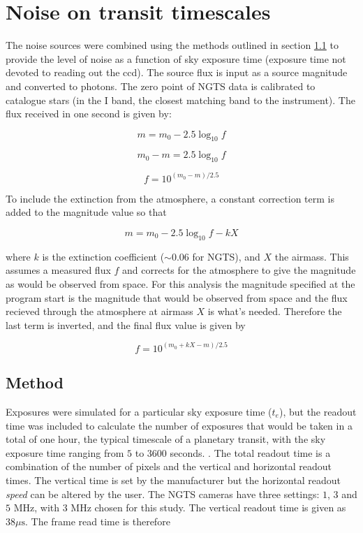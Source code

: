 \documentclass[11pt,a4paper]{report}
\begin{document}
\section{Noise on transit timescales}

The noise sources were combined using the methods outlined in section
\ref{sec:method} to provide the level of noise as a function of sky
exposure time (exposure time not devoted to reading out the ccd). The
source flux is input as a source magnitude and converted to photons. The
zero point of NGTS data is calibrated to catalogue stars (in the I band,
the closest matching band to the instrument). The flux received in one
second is given by:

\[
    m = m_0 - 2.5 \log_{10}{f}
    \]

\[
    m_0 - m = 2.5 \log_{10}{f}
\]

\[
    f = 10^{(m_0 - m) / 2.5}
    \]

To include the extinction from the atmosphere, a constant correction
term is added to the magnitude value so that 

\[
    m = m_0 - 2.5 \log_{10}{f} - k X
    \]

where $k$ is the extinction coefficient ($\sim 0.06$ for NGTS), and $X$
the airmass. This assumes a measured flux $f$ and corrects for the atmosphere to give
the magnitude as would be observed from space. For this analysis the
magnitude specified at the program start is the magnitude that would be
observed from space and the flux recieved through the atmosphere at
airmass $X$ is what's needed. Therefore the last term is inverted, and
the final flux value is given by 

\[
    f = 10^{(m_0 + k X - m) / 2.5}
    \]


\subsection{Method}
\label{sec:method}

Exposures were simulated for a particular sky exposure time ($t_e$), 
but the
readout time was included to calculate the number of exposures that
would be taken in a total of one hour, the typical timescale of a
planetary transit, with the sky exposure time ranging from $5$ to $3600$
seconds. . The total readout time is a combination of the number
of pixels and the vertical and horizontal readout times. The vertical
time is set by the manufacturer but the horizontal readout \emph{speed}
can be altered by the user. The NGTS cameras have three settings: $1$,
$3$ and $5$ MHz, with $3$ MHz chosen for this study. The vertical
readout time is given as $38 \mu\mathrm{s}$. The frame read time is
therefore
\end{document}
